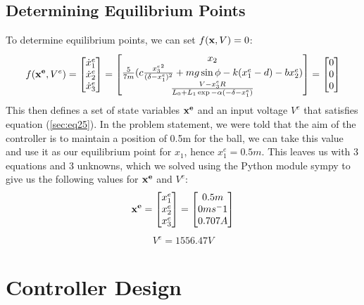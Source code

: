 \documentclass[a4paper,10pt,reqno]{amsart}
\numberwithin{equation}{section}
\begin{document}
\subsection{Determining Equilibrium Points} To determine equilibrium points, we can set $f(\bold x, V)=0$:
\begin{equation}
\label{sec:eq25}
    f(\bold{x^e}, V^e) = \begin{bmatrix} 
        \dot x_1^e \\ 
        \dot x_2^e \\ 
        \dot x_3^e 
    \end{bmatrix} = \begin{bmatrix}
        x_2 \\
        \frac{5}{7m}(c\frac{{x_3^e}^2}{(\delta-x_1^e)^2}+mg\sin{\phi}-k(x_1^e-d)-bx_2^e) \\
        \frac{V-x_3^eR}{L_0+L_1\exp{-\alpha(-\delta-x_1^e)}}
    \end{bmatrix} = \begin{bmatrix}
        0 \\
        0 \\
        0
    \end{bmatrix}
\end{equation}
This then defines a set of state variables $\bold{x^e}$ and an input voltage $V^e$ that satisfies equation (\ref{sec:eq25}). In the problem statement, we were told that the aim of the controller is to maintain a position of 0.5m for the ball, we can take this value and use it as our equilibrium point for $x_1$, hence $x_1^e=0.5m$. This leaves us with 3 equations and 3 unknowns, which we solved using the Python module sympy to give us the following values for $\bold{x^e}$ and $V^e$:
\begin{equation}
    \bold{x^e} = \begin{bmatrix}
        x_1^e \\
        x_2^e \\
        x_3^e
    \end{bmatrix} = \begin{bmatrix}
        0.5m \\
        0ms^-1 \\
        0.707A
    \end{bmatrix}
\end{equation}
\begin{align}
    V^e = 1556.47V
\end{align}
\section{Controller Design}
\end{document}
